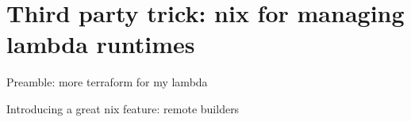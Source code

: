\documentclass[bigger]{beamer}
\begin{document}
\section{Third party trick: nix for managing lambda runtimes}
\label{sec:orgf56d707}
\begin{frame}[label={sec:orgca4d0ee}]{Preamble: more terraform for my lambda}
\end{frame}
\begin{frame}[label={sec:orgad30650}]{Introducing a great nix feature: remote builders}
\end{frame}
\end{document}
